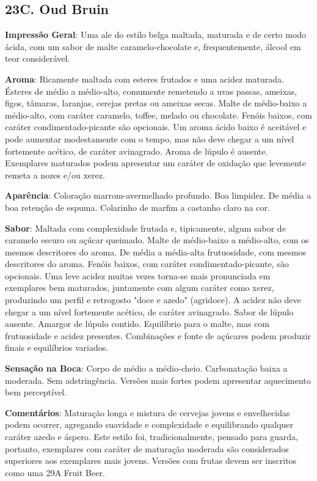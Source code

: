 \subsection*{23C. Oud Bruin}
\textbf{Impressão Geral}: Uma ale do estilo belga maltada, maturada e de certo modo ácida, com um sabor de malte caramelo-chocolate e, frequentemente, álcool em teor considerável.

\textbf{Aroma}: Ricamente maltada com esteres frutados e uma acidez maturada. Ésteres de médio a médio-alto, comumente remetendo a uvas passas, ameixas, figos, tâmaras, laranjas, cerejas pretas ou ameixas secas. Malte de médio-baixo a médio-alto, com caráter caramelo, toffee, melado ou chocolate. Fenóis baixos, com caráter condimentado-picante são opcionais. Um aroma ácido baixo é aceitável e pode aumentar modestamente com o tempo, mas não deve chegar a um nível fortemente acético, de caráter avinagrado. Aroma de lúpulo é ausente. Exemplares maturados podem apresentar um caráter de oxidação que levemente remeta a nozes e/ou xerez.

\textbf{Aparência}: Coloração marrom-avermelhado profundo. Boa limpidez. De média a boa retenção de espuma. Colarinho de marfim a castanho claro na cor.

\textbf{Sabor}: Maltada com complexidade frutada e, tipicamente, algum sabor de caramelo escuro ou açúcar queimado. Malte de médio-baixo a médio-alto, com os mesmos descritores do aroma. De média a média-alta frutuosidade, com mesmos descritores do aroma. Fenóis baixos, com caráter condimentado-picante, são opcionais. Uma leve acidez muitas vezes torna-se mais pronunciada em exemplares bem maturados, juntamente com algum caráter como xerez, produzindo um perfil e retrogosto "doce e azedo" (agridoce). A acidez não deve chegar a um nível fortemente acético, de caráter avinagrado. Sabor de lúpulo ausente. Amargor de lúpulo contido. Equilíbrio para o malte, mas com frutuosidade e acidez presentes. Combinações e fonte de açúcares podem produzir finais e equilíbrios variados.

\textbf{Sensação na Boca}: Corpo de médio a médio-cheio. Carbonatação baixa a moderada. Sem adstringência. Versões mais fortes podem apresentar aquecimento bem perceptível.

\textbf{Comentários}: Maturação longa e mistura de cervejas jovens e envelhecidas podem ocorrer, agregando suavidade e complexidade e equilibrando qualquer caráter azedo e áspero. Este estilo foi, tradicionalmente, pensado para guarda, portanto, exemplares com caráter de maturação moderada são considerados superiores aos exemplares mais jovens. Versões com frutas devem ser inscritos como uma 29A Fruit Beer.

